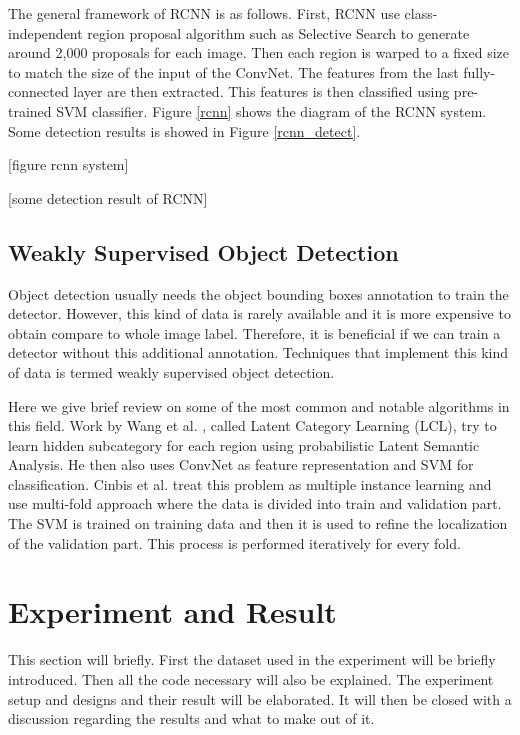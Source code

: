\documentclass[a4paper,11pt]{kth-mag}
\begin{document}
The general framework of RCNN is as follows. First, RCNN use class-independent region proposal algorithm such as Selective Search to generate around 2,000 proposals for each image. Then each region is warped to a fixed size to match the size of the input of the ConvNet. The features from the last fully-connected layer are then extracted. This features is then classified using pre-trained SVM classifier. Figure \ref{rcnn} shows the diagram of the RCNN system. Some detection results is showed in Figure \ref{rcnn_detect}.

[figure rcnn system]

[some detection result of RCNN]

\section{Weakly Supervised Object Detection}
Object detection usually needs the object bounding boxes annotation to train the detector. However, this kind of data is rarely available and it is more expensive to obtain compare to whole image label. Therefore, it is beneficial if we can train a detector without this additional annotation. Techniques that implement this kind of data is termed weakly supervised object detection.

Here we give brief review on some of the most common and notable algorithms in this field. Work by Wang et al. \cite{wang2014lcl}, called Latent Category Learning (LCL), try to learn hidden subcategory for each region using probabilistic Latent Semantic Analysis. He then also uses ConvNet as feature representation and SVM for classification.
Cinbis et al. \cite{cinbis2014mil} treat this problem as multiple instance learning and use multi-fold approach where the data is divided into train and validation part. The SVM is trained on training data and then it is used to refine the localization of the validation part. This process is performed iteratively for every fold.


\chapter{Experiment and Result}
This section will briefly. First the dataset used in the experiment will be briefly introduced. Then all the code necessary will also be explained. The experiment setup and designs and their result will be elaborated. It will then be closed with a discussion regarding the results and what to make out of it.
\end{document}

